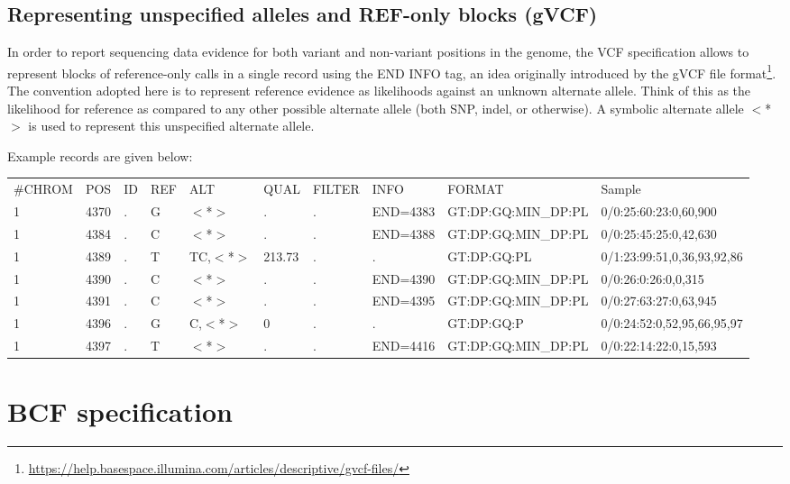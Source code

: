 \documentclass[8pt]{article}
\begin{document}
\subsection{Representing unspecified alleles and REF-only blocks (gVCF)}
In order to report sequencing data evidence for both variant and non-variant
positions in the genome, the VCF specification allows to represent blocks of reference-only calls in a single record
using the END INFO tag, an idea originally introduced by the gVCF file format\footnote{\url{https://help.basespace.illumina.com/articles/descriptive/gvcf-files/}}.
The convention adopted here is to represent reference evidence as likelihoods against an
unknown alternate allele. Think of this as the likelihood for reference as compared to any other possible alternate
allele (both SNP, indel, or otherwise). A symbolic alternate allele $<$*$>$
is used to represent this unspecified alternate allele.

Example records are given below:
\scriptsize
\begin{flushleft}
\begin{tabular}{ l l l l l l l l l l }
\#CHROM & POS & ID & REF & ALT & QUAL & FILTER & INFO & FORMAT & Sample \\
1 & 4370 & . & G & $<$*$>$ & . & . & END=4383 & GT:DP:GQ:MIN\_DP:PL & 0/0:25:60:23:0,60,900 \\
1 & 4384 & . & C & $<$*$>$ & . & . & END=4388 & GT:DP:GQ:MIN\_DP:PL & 0/0:25:45:25:0,42,630 \\
1 & 4389 & . & T & TC,$<$*$>$ & 213.73 & . & . & GT:DP:GQ:PL & 0/1:23:99:51,0,36,93,92,86 \\
1 & 4390 & . & C & $<$*$>$ & . & . & END=4390 & GT:DP:GQ:MIN\_DP:PL & 0/0:26:0:26:0,0,315 \\
1 & 4391 & . & C & $<$*$>$ & . & . & END=4395 & GT:DP:GQ:MIN\_DP:PL & 0/0:27:63:27:0,63,945 \\
1 & 4396 & . & G & C,$<$*$>$ & 0 & . & . & GT:DP:GQ:P & 0/0:24:52:0,52,95,66,95,97 \\
1 & 4397 & . & T & $<$*$>$ & . & . & END=4416 & GT:DP:GQ:MIN\_DP:PL & 0/0:22:14:22:0,15,593 \\
\end{tabular}
\end{flushleft}
\normalsize

\pagebreak
\section{BCF specification}
\end{document}
